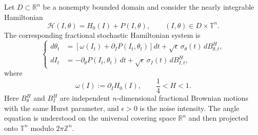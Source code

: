 \documentclass[preprint,12pt]{elsarticle}
\theoremstyle{definition}
\theoremstyle{plain}
\begin{document}
Let $D\subset\mathbb R^n$ be a nonempty bounded domain and consider
the nearly integrable Hamiltonian
\begin{equation}
\label{eq:nearly-integrable-Hamiltonian}
    \mathscr H(I,\theta)
    =
    H_0(I)+P(I,\theta),
    \qquad
    (I,\theta)\in D\times\mathbb T^n.
\end{equation}
The corresponding fractional stochastic Hamiltonian system is
\begin{equation}
\label{eq:fractional-stochastic-KAM-system}
\left\{
\begin{aligned}
    d\theta_t
    &=
    \left[
        \omega(I_t)
        +
        \partial_I P(I_t,\theta_t)
    \right]dt
    +
    \sqrt{\epsilon}\,
    \sigma_\theta(t)\,dB_{\theta,t}^{H},
    \\
    dI_t
    &=
    -
    \partial_\theta P(I_t,\theta_t)\,dt
    +
    \sqrt{\epsilon}\,
    \sigma_I(t)\,dB_{I,t}^{H},
\end{aligned}
\right.
\end{equation}
where
\begin{equation*}
    \omega(I):=\partial_IH_0(I),
    \qquad
    \frac14<H<1.
\end{equation*}
Here $B_\theta^H$ and $B_I^H$ are independent $n$-dimensional
fractional Brownian motions with the same Hurst parameter, and
$\epsilon>0$ is the noise intensity. The angle equation is understood
on the universal covering space $\mathbb R^n$ and then projected onto
$\mathbb T^n$ modulo $2\pi\mathbb Z^n$.
\end{document}
